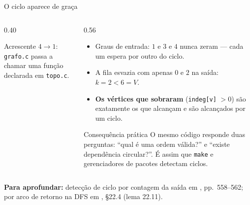 \documentclass[aspectratio=169]{beamer}
\newcommand{\fonte}[1]{%
  \vfill
  {\tiny\color{gray!55!black}\textbf{Para aprofundar:} #1\par}%
}
\begin{document}
\begin{frame}{O ciclo aparece de graça}
  \begin{columns}[T]
    \begin{column}{0.40\textwidth}
      \begin{center}
      \end{center}
      {\scriptsize Acrescente $4 \to 1$: \texttt{grafo.c} passa a chamar uma
      função declarada em \texttt{topo.c}.}
    \end{column}
    \begin{column}{0.56\textwidth}
      {\small
      \begin{itemize}\scriptsize
        \item Graus de entrada: $1$ e $3$ e $4$ nunca zeram --- cada um espera
              por outro do ciclo.
        \item A fila esvazia com apenas $0$ e $2$ na saída: $k = 2 < 6 = V$.
        \item \textbf{Os vértices que sobraram} (\texttt{indeg[v]} $> 0$) são
              exatamente os que alcançam e são alcançados por um ciclo.
      \end{itemize}}
      \begin{block}{Consequência prática}
        {\scriptsize O mesmo código responde duas perguntas: ``qual é uma ordem
        válida?'' e ``existe dependência circular?''. É assim que
        \texttt{make} e gerenciadores de pacotes detectam ciclos.}
      \end{block}
    \end{column}
  \end{columns}
  \fonte{detecção de ciclo por contagem da saída em \cite{kahn1962topological}, pp.~558--562;
  por arco de retorno na DFS em \cite{cormen2009introduction}, §22.4
  (lema 22.11).}
\end{frame}
\end{document}
